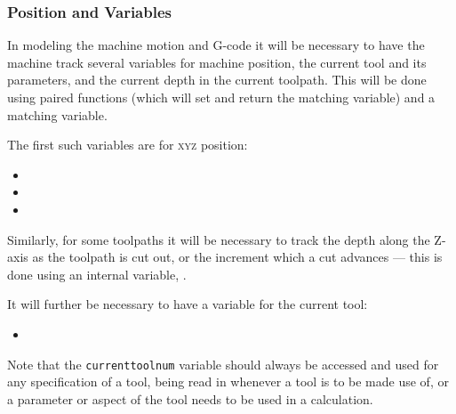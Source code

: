 \documentclass{ltxdoc}
\begin{document}
\subsubsection{Position and Variables}
 
In modeling the machine motion and G-code it will be necessary to have the machine track several variables for machine position, the current tool and its parameters, and the current depth in the current toolpath. This will be done using paired functions (which will set and return the  matching variable) and a matching variable.

\begin{samepage}
The first such variables are for \textsc{xyz} position:

\begin{itemize}
 \item {}
 \item {}
 \item {}
\end{itemize}
\end{samepage}

\noindent Similarly, for some toolpaths it will be necessary to track the depth along the Z-axis as the toolpath is cut out, or the increment which a cut advances --- this is done using an internal variable, .
% 

\begin{samepage}

It will further be necessary to have a variable for the current tool:

\begin{itemize}
 \item {}
\end{itemize}
\end{samepage}

\noindent Note that the \verb|currenttoolnum| variable should always be accessed and used for any specification of a tool, being read in whenever a tool is to be made use of, or a parameter or aspect of the tool needs to be used in a calculation. %
\end{document}
